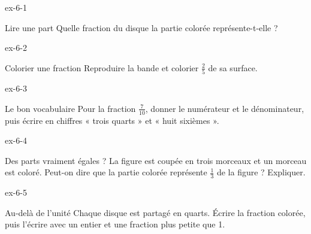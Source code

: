 \clearpage{}
\begin{blocLivre}{ex-6-1}\begin{exercice}[1]{Lire une part}
Quelle fraction du disque la partie colorée représente-t-elle ?
\label{fig-ex-6-1}
\end{exercice}\end{blocLivre}
\begin{blocLivre}{ex-6-2}\begin{exercice}[1]{Colorier une fraction}
Reproduire la bande et colorier $\frac25$ de sa surface.
\label{fig-ex-6-2}
\end{exercice}\end{blocLivre}
\begin{blocLivre}{ex-6-3}\begin{exercice}[1]{Le bon vocabulaire}
Pour la fraction $\frac7{10}$, donner le numérateur et le dénominateur, puis écrire en chiffres « trois quarts » et « huit sixièmes ».
\end{exercice}\end{blocLivre}
\begin{blocLivre}{ex-6-4}\begin{exercice}[1]{Des parts vraiment égales ?}
La figure est coupée en trois morceaux et un morceau est coloré. Peut-on dire que la partie colorée représente $\frac13$ de la figure ? Expliquer.
\label{fig-ex-6-4}
\end{exercice}\end{blocLivre}
\begin{blocLivre}{ex-6-5}\begin{exercice}[1]{Au-delà de l’unité}
Chaque disque est partagé en quarts. Écrire la fraction colorée, puis l’écrire avec un entier et une fraction plus petite que 1.
\label{fig-ex-6-5}
\end{exercice}\end{blocLivre}


